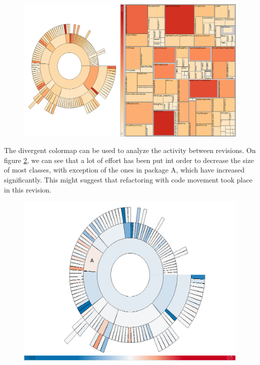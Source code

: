 \begin{figure}[H]
  \centering
  \includegraphics[width=1\textwidth]{figures/colormap_hier.png}
  \caption{}
  \label{fig:colormap_hier}
\end{figure}

The divergent colormap can be used to analyze the activity between revisions. On figure \ref{fig:colormap_div_sun}, we can see that a lot of effort has been put int order to decrease the size of most classes, with exception of the ones in package A, which have increased significantly. This might suggest that refactoring with code movement took place in this revision.

\begin{figure}[H]
  \centering
  \includegraphics[width=1.0\textwidth]{figures/colormap_div_sun.png}
  \caption{}
  \label{fig:colormap_div_sun}
\end{figure}

